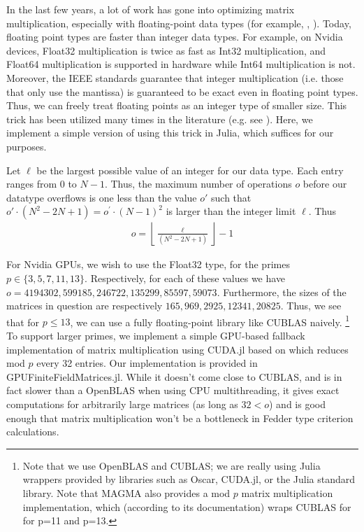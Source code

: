In the last few years, a lot of work has gone into optimizing matrix multiplication,
especially with floating-point data types
(for example, \cite{nvidia-2024-cublas}, \cite{openblas-2024-openblas}). 
Today, floating point types are faster than
integer data types.
For example, on Nvidia devices, Float32 multiplication
is twice as fast as Int32 multiplication, and Float64
multiplication is supported in hardware while Int64 multiplication
is not.
Moreover, the IEEE standards guarantee that integer multiplication (i.e. those that only use the mantissa) 
is guaranteed to be exact even in floating point types. 
Thus, we can freely treat floating points as an integer type of smaller size.
This trick has been utilized many times in the literature (e.g. see \cite{bglm-2024-matmul-modp}).
Here, we implement a simple version of using this trick in Julia,
which suffices for our purposes.

Let \(\ell\) be the largest possible value of an integer for our data type.
Each entry ranges from \(0\) to \(N-1\).
Thus, the maximum number of operations $o$ before our datatype overflows is one less than the value $o'$ such that 
$o' \cdot (N^2 - 2N + 1) = o^{\prime} \cdot (N-1)^{2} $ is larger than the integer limit $\ell$. Thus
\begin{align*}
    o = \left\lfloor \frac{\ell}{(N^2 - 2N + 1)} \right\rfloor - 1
\end{align*}

For Nvidia GPUs, we wish to use the Float32 type, for the primes
\(p \in \{3,5,7,11,13\}\).
Respectively, for each of these values we have
\(o = 4194302, 599185, 246722, 135299, 85597, 59073\).
Furthermore, the sizes of the matrices in question are 
respectively
 \(165, 969, 2925, 12341, 20825\).
Thus, we see that for \(p \leq 13\), we can use a fully floating-point
library like CUBLAS naively.
\footnote{
    Note that we use OpenBLAS and CUBLAS; 
    we are really using Julia wrappers
    provided by libraries such as Oscar, 
    CUDA.jl, or the Julia standard library.
    Note that MAGMA also provides
    a mod $p$ matrix multiplication implementation,
    which (according to its documentation) wraps CUBLAS for 
    for p=11 and
    p=13. 
}
To support larger primes, we implement a 
simple GPU-based fallback implementation of matrix multiplication using CUDA.jl
based on \cite{mao-2024-matmul}
which reduces mod \(p\) every 32 entries.
Our implementation is provided in GPUFiniteFieldMatrices.jl.
While it doesn't come close to CUBLAS, and is in fact slower
than a OpenBLAS when using CPU multithreading, it gives exact
computations for arbitrarily large
matrices (as long as \(32 < o\))
and is good enough that
matrix multiplication won't be a bottleneck in 
Fedder type criterion calculations.

